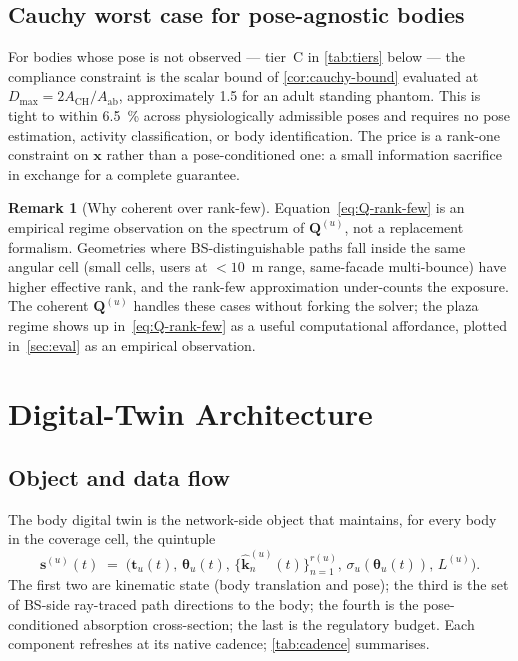 \documentclass[journal,twoside,onecolumn]{IEEEtran}
\theoremstyle{definition}
\newtheorem{remark}[theorem]{Remark}
\newcommand{\khat}{\hat{\bm{k}}}
\newcommand{\xx}{\mathbf{x}}
\newcommand{\Q}{\mathbf{Q}}
\newcommand{\Aab}{A_{\mathrm{ab}}}
\begin{document}
\subsection{Cauchy worst case for pose-agnostic bodies}

For bodies whose pose is not observed --- tier~C in
\cref{tab:tiers} below --- the compliance constraint is the scalar
bound of \cref{cor:cauchy-bound} evaluated at
$D_{\max}=2A_{\mathrm{CH}}/\Aab$, approximately 1.5 for an adult
standing phantom. This is tight to within \SI{6.5}{\percent}
across physiologically admissible poses and requires no pose
estimation, activity classification, or body identification. The
price is a rank-one constraint on $\xx$ rather than a
pose-conditioned one: a small information sacrifice in exchange
for a complete guarantee.

\begin{remark}[Why coherent over rank-few]\label{rem:coherent}
Equation~\eqref{eq:Q-rank-few} is an empirical regime observation
on the spectrum of $\Q^{(u)}$, not a replacement formalism.
Geometries where BS-distinguishable paths fall inside the same
angular cell (small cells, users at $<10$~m range, same-facade
multi-bounce) have higher effective rank, and the rank-few
approximation under-counts the exposure. The coherent
$\Q^{(u)}$ handles these cases without forking the solver; the
plaza regime shows up in~\eqref{eq:Q-rank-few} as a useful
computational affordance, plotted in~\cref{sec:eval} as an
empirical observation.
\end{remark}

\section{Digital-Twin Architecture}\label{sec:dt}

\subsection{Object and data flow}

The body digital twin is the network-side object that maintains,
for every body in the coverage cell, the quintuple
\begin{equation}\label{eq:twin-state}
  \bm{s}^{(u)}(t)\;=\;
  \bigl(\mathbf{t}_u(t),\,\bm\theta_u(t),\,
        \{\khat_n^{(u)}(t)\}_{n=1}^{r(u)},\,
        \sigma_u(\bm\theta_u(t)),\,L^{(u)}\bigr).
\end{equation}
The first two are kinematic state (body translation and pose); the
third is the set of BS-side ray-traced path directions to the
body; the fourth is the pose-conditioned absorption cross-section;
the last is the regulatory budget. Each component refreshes at its
native cadence; \cref{tab:cadence} summarises.
\end{document}
